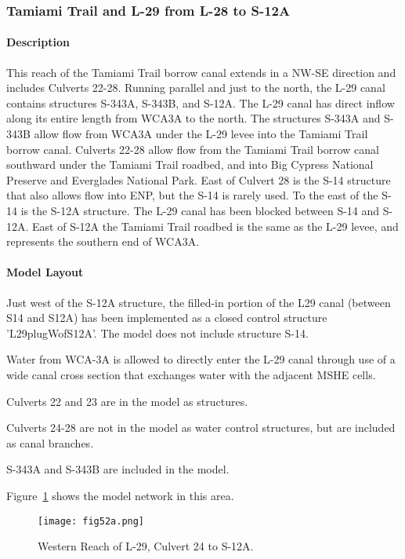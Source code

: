 \clearpage


\subsubsection{Tamiami Trail and L-29 from L-28 to S-12A}
\paragraph{Description}
This reach of the Tamiami Trail borrow canal extends in a NW-SE direction and includes Culverts 22-28. Running parallel and just to the north, the L-29 canal contains structures S-343A, S-343B, and S-12A. The L-29 canal has direct inflow along its entire length from WCA3A to the north. The structures S-343A and S-343B allow flow from WCA3A under the L-29 levee into the Tamiami Trail borrow canal. Culverts 22-28 allow flow from the Tamiami Trail borrow canal southward under the Tamiami Trail roadbed, and into Big Cypress National Preserve and Everglades National Park. East of Culvert 28 is the S-14 structure that also allows flow into ENP, but the S-14 is rarely used. To the east of the S-14 is the S-12A structure.
The L-29 canal has been blocked between S-14 and S-12A. East of S-12A the Tamiami Trail roadbed is the same as the L-29 levee, and represents the southern end of WCA3A.

\paragraph{Model Layout}
Just west of the S-12A structure, the filled-in portion of the L29 canal (between S14 and S12A) has been implemented as a closed control structure 'L29plugWofS12A'. The model does not include structure S-14.

Water from WCA-3A is allowed to directly enter the L-29 canal through use of a wide canal cross section that exchanges water with the adjacent MSHE cells.

Culverts 22 and 23 are in the model as structures.

Culverts 24-28 are not in the model as water control structures, but are included as canal branches.

S-343A and S-343B are included in the model.

Figure~\ref{fig:fig52a} shows the model network in this area.

\begin{figure}[!h]
  \begin{center}
  \texttt{[image: fig52a.png]}
  \caption{Western Reach of L-29, Culvert 24 to S-12A.}
  \label{fig:fig52a}
  \end{center}
\end{figure}

